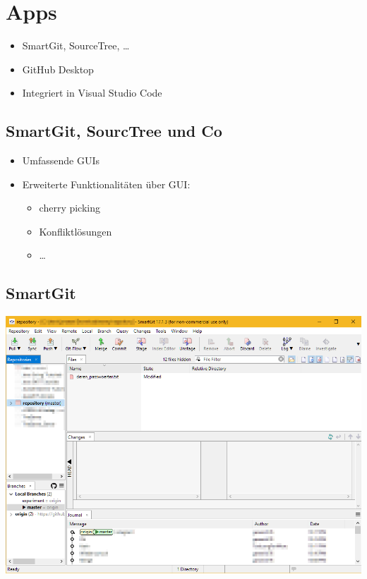 \section{Apps}
\begin{frame}
\begin{itemize}
	\item<2-> SmartGit, SourceTree, …
	\item<3-> GitHub Desktop
	\item<4-> Integriert in Visual Studio Code
\end{itemize}
\end{frame}

\subsection{SmartGit, SourcTree und Co}
\begin{frame}
\begin{itemize}
\item<2-> Umfassende GUIs
\item<3-> Erweiterte Funktionalitäten über GUI:
\begin{itemize}
\item<4-> cherry picking
\item<5-> Konfliktlösungen
\item<6-> …
\end{itemize}
\end{itemize}
\end{frame}

\subsection{SmartGit}
\begin{frame}
\begin{center}
\includegraphics[scale=.4]{bilder/smartgit.png}
\end{center}
\end{frame}

